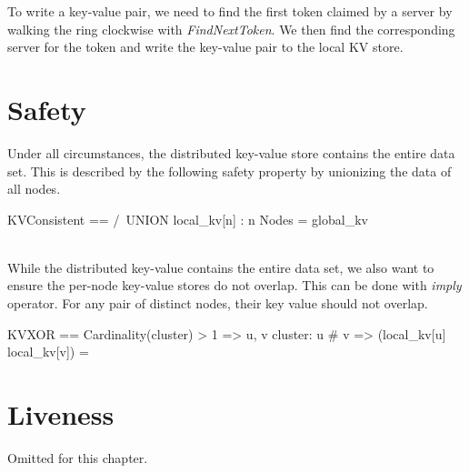 To write a key-value pair, we need to find the first token claimed by a
server by walking the ring clockwise with \textit{FindNextToken}. We then find
the corresponding server for the token and write the key-value pair to the
local KV store.

\section{Safety} 

Under all circumstances, the distributed key-value store contains the 
entire data set. This is described by the following safety property by unionizing
the data of all nodes.\\

\begin{tla}
KVConsistent == 
    /\ UNION {local_kv[n] : n \in Nodes} = global_kv
\end{tla}
\begin{tlatex}
%
\end{tlatex}
\\

While the distributed key-value contains the entire data set, we also want to
ensure the per-node key-value stores do not overlap. This can
be done with \textit{imply} operator. For any pair of distinct nodes,
their key value should not overlap.\\

\begin{tla}
KVXOR == 
    Cardinality(cluster) > 1 => 
        \A u, v \in cluster: u # v => (local_kv[u] \intersect local_kv[v]) = {}
\end{tla}
\begin{tlatex}
%
%
\end{tlatex}

\section{Liveness}

Omitted for this chapter.

% 

